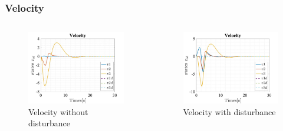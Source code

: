 \documentclass{beamer}
\begin{document}
\begin{frame}
    \frametitle{Velocity}

    \begin{columns}

        \begin{figure}[h]
            \centering
            \includegraphics[width=1\textwidth]{Velocity_T_Servo.jpg}
            \caption{Velocity without disturbance}
        \end{figure}

        \begin{figure}[h]
            \centering
            \includegraphics[width=1\textwidth]{Velocity_T_Servo_Dist.jpg}
            \caption{Velocity with disturbance}
        \end{figure}
    \end{columns}
\end{frame}
\end{document}
